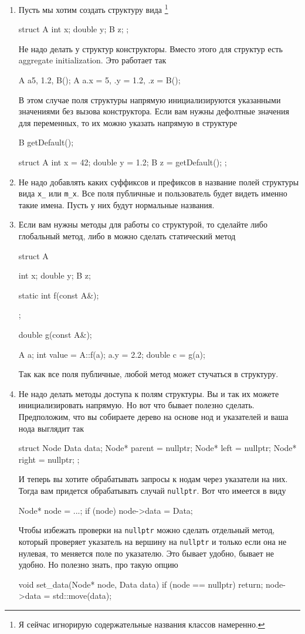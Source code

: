 \begin{enumerate}
\item 
Пусть мы хотим создать структуру вида%
\footnote{Я сейчас игнорирую содержательные названия классов намеренно.}
\begin{cppcode}
struct A {
  int x;
  double y;
  B z;
};
\end{cppcode}
Не надо делать у структур конструкторы.
Вместо этого для структур есть aggregate initialization.
Это работает так
\begin{cppcode}
A a{5, 1.2, B()};
A a{.x = 5, .y = 1.2, .z = B()};
\end{cppcode}
В этом случае поля структуры напрямую инициализируются указанными значениями без вызова конструктора.
Если вам нужны дефолтные значения для переменных, то их можно указать напрямую в структуре
\begin{cppcode}
B getDefault();

struct A {
  int x = 42;
  double y = 1.2;
  B z = getDefault();
};
\end{cppcode}

\item
Не надо добавлять каких суффиксов и префиксов в название полей структуры вида \verb"x_" или \verb"m_x".
Все поля публичные и пользователь будет видеть именно такие имена.
Пусть у них будут нормальные названия.

\item
Если вам нужны методы для работы со структурой, то сделайте либо глобальный метод, либо в можно сделать статический метод
\begin{cppcode}
struct A {
  int x;
  double y;
  B z;
  
  static int f(const A&);
};

double g(const A&);

A a;
int value = A::f(a);
a.y = 2.2;
double c = g(a);
\end{cppcode}
Так как все поля публичные, любой метод может стучаться в структуру.

\item Не надо делать методы доступа к полям структуры.
Вы и так их можете инициализировать напрямую.
Но вот что бывает полезно сделать.
Предположим, что вы собираете дерево на основе нод и указателей и ваша нода выглядит так
\begin{cppcode}
struct Node {
  Data data;
  Node* parent = nullptr;
  Node* left = nullptr;
  Node* right = nullptr;
};
\end{cppcode}
И теперь вы хотите обрабатывать запросы к нодам через указатели на них.
Тогда вам придется обрабатывать случай \verb"nullptr".
Вот что имеется в виду
\begin{cppcode}
Node* node = ...;
if (node)
  node->data = Data{};
\end{cppcode}
Чтобы избежать проверки на \verb"nullptr" можно сделать отдельный метод, который проверяет указатель на вершину на \verb"nullptr" и только если она не нулевая, то меняется поле по указателю.
Это бывает удобно, бывает не удобно.
Но полезно знать, про такую опцию
\begin{cppcode}
void set_data(Node* node, Data data) {
  if (node == nullptr)
    return;
  node->data = std::move(data);
}


\end{cppcode}
\end{enumerate}
